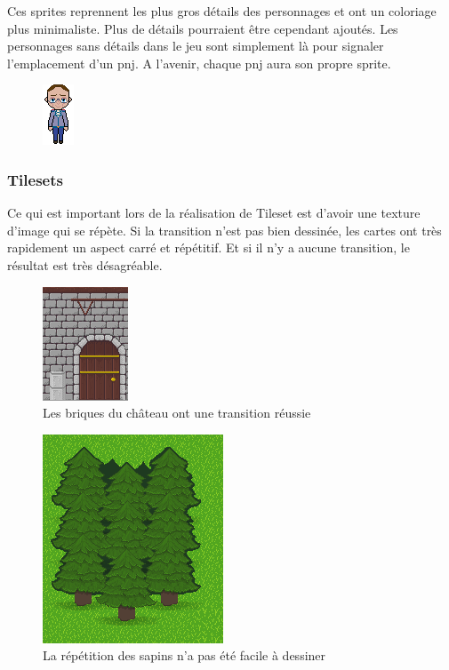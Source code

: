 \documentclass[11pt]{article}
\begin{document}
Ces sprites reprennent les plus gros détails des personnages et ont un coloriage plus minimaliste. Plus de détails pourraient être cependant ajoutés. Les personnages sans détails dans le jeu sont simplement là pour signaler l'emplacement d'un pnj. A l'avenir, chaque pnj aura son propre sprite.
\begin{figure}[H]
\includegraphics[scale=1.5]{panglossSprite}
\centering
\end{figure}
\subsubsection{Tilesets}
Ce qui est important lors de la réalisation de Tileset est d'avoir une texture d'image qui se répète. Si la transition n'est pas bien dessinée, les cartes ont très rapidement un aspect carré et répétitif. Et si il n'y a aucune transition, le résultat est très désagréable.
\begin{figure}[H]
\includegraphics{chateauTset}
\centering
\caption{Les briques du château ont une transition réussie}
\end{figure}
\begin{figure}[H]
\includegraphics{terrain1}
\centering
\caption{La répétition des sapins n'a pas été facile à dessiner}
\end{figure}
\end{document}
